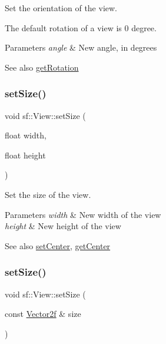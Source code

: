 Set the orientation of the view. 

The default rotation of a view is 0 degree.


\begin{DoxyParams}{Parameters}
{\em angle} & New angle, in degrees\\
\hline
\end{DoxyParams}
\begin{DoxySeeAlso}{See also}
\hyperlink{classsf_1_1_view_a324d8885f4ab17f1f7b0313580c9b84e}{get\+Rotation} 
\end{DoxySeeAlso}
\mbox{\label{classsf_1_1_view_a9525b73fe9fbaceb9568faf56b399dab}} 
\subsubsection{\texorpdfstring{set\+Size()}{setSize()}\hspace{0.1cm}{\footnotesize\ttfamily [1/2]}}
{\footnotesize\ttfamily void sf\+::\+View\+::set\+Size (\begin{DoxyParamCaption}\item[{float}]{width,  }\item[{float}]{height }\end{DoxyParamCaption})}



Set the size of the view. 


\begin{DoxyParams}{Parameters}
{\em width} & New width of the view \\
\hline
{\em height} & New height of the view\\
\hline
\end{DoxyParams}
\begin{DoxySeeAlso}{See also}
\hyperlink{classsf_1_1_view_aa8e3fedb008306ff9811163545fb75f2}{set\+Center}, \hyperlink{classsf_1_1_view_a7f4443c194c691ae4dcf8fd9dd0eaa46}{get\+Center} 
\end{DoxySeeAlso}
\mbox{\label{classsf_1_1_view_a9e08d471ce21aa0e69ce55ff9de66d29}} 
\subsubsection{\texorpdfstring{set\+Size()}{setSize()}\hspace{0.1cm}{\footnotesize\ttfamily [2/2]}}
{\footnotesize\ttfamily void sf\+::\+View\+::set\+Size (\begin{DoxyParamCaption}\item[{const \hyperlink{classsf_1_1_vector2}{Vector2f} \&}]{size }\end{DoxyParamCaption})}



